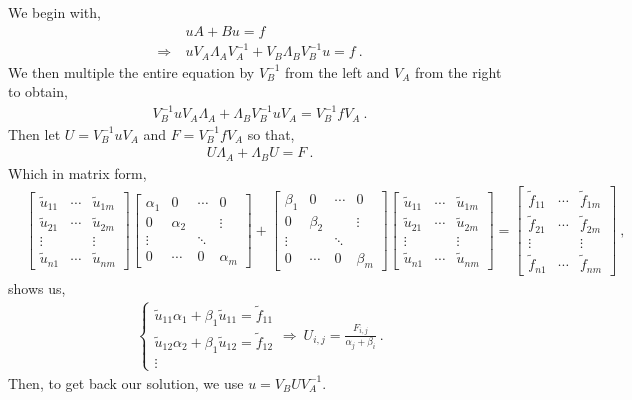 \begin{questions}
\begin{solution}
We begin with,
\begin{align*}
& uA + Bu = f \\
\Rightarrow ~& uV_A \Lambda_AV_A^{-1} + V_B \Lambda_BV_B^{-1} u = f~.
\end{align*}
We then multiple the entire equation by $V_B^{-1}$ from the left and $V_A$ from the right to obtain,
\begin{align*}
V_B^{-1}uV_A\Lambda_A + \Lambda_B V_B^{-1} u V_A = V_B^{-1} f V_A~.
\end{align*}
Then let $U = V_B^{-1}uV_A$ and $F = V_B^{-1} f V_A$ so that,
\begin{align*}
U\Lambda_A + \Lambda_B U = F~.
\end{align*}
Which in matrix form,
\begin{align*}
&\begin{bmatrix}
\tilde{u}_{11}& \cdots & \tilde{u}_{1m} \\
\tilde{u}_{21}& \cdots & \tilde{u}_{2m} \\
\vdots& ~ & \vdots \\
\tilde{u}_{n1}& \cdots & \tilde{u}_{nm}
\end{bmatrix} \begin{bmatrix}
\alpha_1 & 0 & \cdots & 0 \\
0 & \alpha_2 & ~ & \vdots \\
\vdots & ~& \ddots & ~ \\
0 & \cdots & 0 & \alpha_m
\end{bmatrix} + \begin{bmatrix}
\beta_1 & 0 & \cdots & 0 \\
0 & \beta_2 & ~ & \vdots \\
\vdots & ~& \ddots & ~ \\
0 & \cdots & 0 & \beta_m
\end{bmatrix}\begin{bmatrix}
\tilde{u}_{11}& \cdots & \tilde{u}_{1m} \\
\tilde{u}_{21} & \cdots & \tilde{u}_{2m} \\
\vdots& ~ & \vdots \\
\tilde{u}_{n1} & \cdots & \tilde{u}_{nm}
\end{bmatrix} = \begin{bmatrix}
\tilde{f}_{11} & \cdots & \tilde{f}_{1m} \\
\tilde{f}_{21} & \cdots & \tilde{f}_{2m} \\
\vdots & ~ & \vdots \\
\tilde{f}_{n1} & \cdots & \tilde{f}_{nm}
\end{bmatrix}~,
\end{align*}
shows us,
\begin{align*}
 \begin{cases} \tilde{u}_{11}\alpha_1 + \beta_1 \tilde{u}_{11} = \tilde{f}_{11} \\ \tilde{u}_{12}\alpha_2 + \beta_1 \tilde{u}_{12} = \tilde{f}_{12} \\ \vdots \end{cases} \Rightarrow ~U_{i,j} = \frac{F_{i,j}}{\alpha_j + \beta_i}~.
\end{align*}
Then, to get back our solution, we use $u = V_B U V_A^{-1}$.


\end{solution}
\end{questions}
